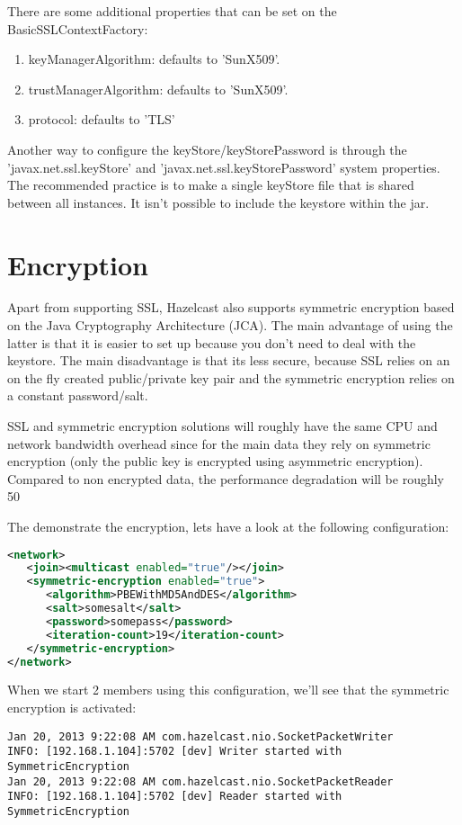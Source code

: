 There are some additional properties that can be set on the BasicSSLContextFactory:
\begin{enumerate}
\item keyManagerAlgorithm: defaults to 'SunX509'.
\item trustManagerAlgorithm: defaults to 'SunX509'.
\item protocol: defaults to 'TLS'
\end{enumerate}
Another way to configure the keyStore/keyStorePassword is through the 'javax.net.ssl.keyStore' and 'javax.net.ssl.keyStorePassword' system properties. The recommended practice is to make a single keyStore file that is shared between all instances. It isn't possible to include the keystore within the jar.

\section{Encryption}
Apart from supporting SSL, Hazelcast also supports symmetric encryption based on the Java Cryptography Architecture (JCA). The main advantage of using the latter is that it is easier to set up because you don't need to deal with the keystore. The main disadvantage is that its less secure, because SSL relies on an on the fly created public/private key pair and the symmetric encryption relies on a constant password/salt.

SSL and symmetric encryption solutions will roughly have the same CPU and network bandwidth overhead since for the main data  they rely on symmetric encryption (only the public key is encrypted using asymmetric encryption). Compared to non encrypted data, the performance degradation will be roughly 50%

The demonstrate the encryption, lets have a look at the following configuration:
\begin{lstlisting}[language=xml]
<network>
   <join><multicast enabled="true"/></join>
   <symmetric-encryption enabled="true">
      <algorithm>PBEWithMD5AndDES</algorithm>
      <salt>somesalt</salt>
      <password>somepass</password>
      <iteration-count>19</iteration-count>
   </symmetric-encryption>
</network>
\end{lstlisting}
When we start 2 members using this configuration, we'll see that the symmetric encryption is activated:
\begin{lstlisting}
Jan 20, 2013 9:22:08 AM com.hazelcast.nio.SocketPacketWriter
INFO: [192.168.1.104]:5702 [dev] Writer started with SymmetricEncryption
Jan 20, 2013 9:22:08 AM com.hazelcast.nio.SocketPacketReader
INFO: [192.168.1.104]:5702 [dev] Reader started with SymmetricEncryption
\end{lstlisting}

